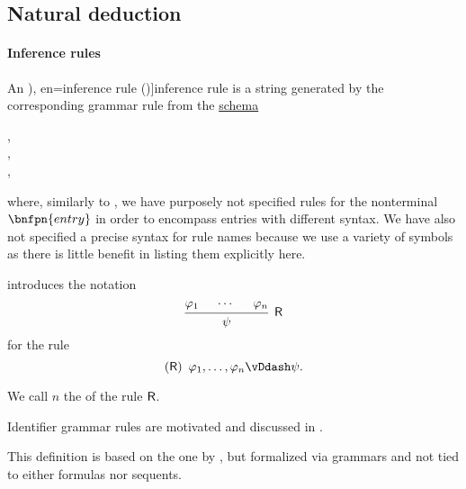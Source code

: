 \subsection{Natural deduction}\label{subsec:natural_deduction}

\paragraph{Inference rules}

\begin{definition}\label{def:inference_rule}\mimprovised
  An \term[ru=правило вывода (\cite[31]{Герасимов2011}), en=inference rule (\cite[2]{MartinLof1996Meanings})]{inference rule} is a string generated by the corresponding grammar rule from the \hyperref[def:formal_grammar/schema]{schema}
  \begin{bnf*}
         { \bnfor {} \bnfsp \bnftsq{,} \bnfsp {}}, \\
           {\bnfes \bnfor {} \bnfor {}}, \\
         {}, \\
     {\bnftsq{(} \bnfsp {} \bnfsp \bnftsq{)} \bnfsp {} \bnfsp \bnftsq{\( \vDdash \)} \bnfsp {}}
  \end{bnf*}
  where, similarly to , we have purposely not specified rules for the nonterminal \( \bnfpn{entry} \) in order to encompass entries with different syntax. We have also not specified a precise syntax for rule names because we use a variety of symbols as there is little benefit in listing them explicitly here.

   introduces the notation
  \begin{equation*}
    \begin{prooftree}
      \hypo{ \varphi_1 }
      \hypo{ \cdots }
      \hypo{ \varphi_n }
      \infer3[\logic{R}]{ \psi }
    \end{prooftree}
  \end{equation*}
  for the rule
  \begin{equation*}
    (\logic{R}) \enspace \varphi_1, \ldots, \varphi_n \vDdash \psi.
  \end{equation*}

  We call \( n \) the  of the rule \( \textsf{R} \).
\end{definition}
\begin{comments}
  \item Identifier grammar rules are motivated and discussed in .
  \item This definition is based on the one by , but formalized via grammars and not tied to either formulas nor sequents.
\end{comments}

